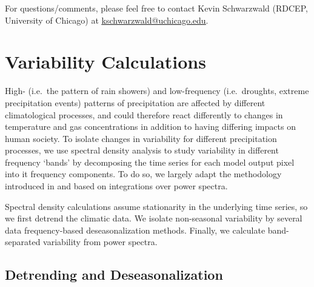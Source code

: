 \documentclass[11pt]{amsart}
\begin{document}
For questions/comments, please feel free to contact Kevin Schwarzwald (RDCEP, University of Chicago) at \href{mailto:kschwarzwald@uchicago.edu}{\underline{kschwarzwald@uchicago.edu}}.




\appendix
\section{Variability Calculations}
\label{sec:variability_calcs}
High- (i.e.\ the pattern of rain showers) and low-frequency (i.e.\ droughts, extreme precipitation events) patterns of precipitation are affected by different climatological processes, and could therefore react differently to changes in temperature and gas concentrations in addition to having differing impacts on human society. To isolate changes in variability for different precipitation processes, we use spectral density analysis to study variability in different frequency `bands' by decomposing the time series for each model output pixel into it frequency components. To do so, we largely adapt the methodology introduced in \cite{leeds_simulation_2015} and \cite{klavans_influence_2016} based on integrations over power spectra.

Spectral density calculations assume stationarity in the underlying time series, so we first detrend the climatic data. We isolate non-seasonal variability by several data frequency-based deseasonalization methods. Finally, we calculate band-separated variability from power spectra. 
\subsection{Detrending and Deseasonalization} %
\label{sec:detrend_deseas}
\end{document}
